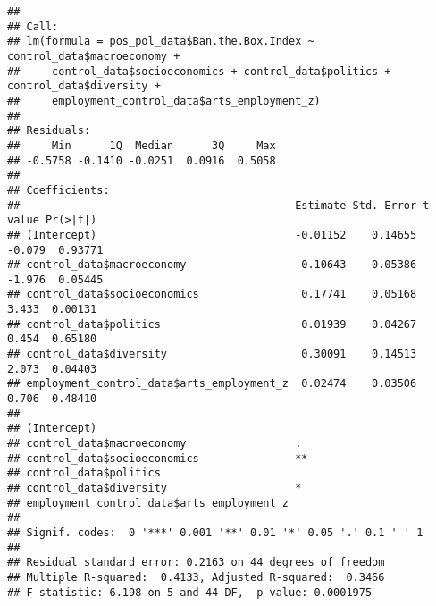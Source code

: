\documentclass[
]{article}
\newenvironment{Shaded}{\begin{snugshade}}{\end{snugshade}}
\newcommand{\CommentTok}[1]{\textcolor[rgb]{0.56,0.35,0.01}{\textit{#1}}}
\newcommand{\FunctionTok}[1]{\textcolor[rgb]{0.13,0.29,0.53}{\textbf{#1}}}
\newcommand{\NormalTok}[1]{#1}
\newcommand{\OtherTok}[1]{\textcolor[rgb]{0.56,0.35,0.01}{#1}}
\newcommand{\SpecialCharTok}[1]{\textcolor[rgb]{0.81,0.36,0.00}{\textbf{#1}}}
\begin{document}
\begin{Shaded}
\end{Shaded}

\begin{verbatim}
## 
## Call:
## lm(formula = pos_pol_data$Ban.the.Box.Index ~ control_data$macroeconomy + 
##     control_data$socioeconomics + control_data$politics + control_data$diversity + 
##     employment_control_data$arts_employment_z)
## 
## Residuals:
##     Min      1Q  Median      3Q     Max 
## -0.5758 -0.1410 -0.0251  0.0916  0.5058 
## 
## Coefficients:
##                                           Estimate Std. Error t value Pr(>|t|)
## (Intercept)                               -0.01152    0.14655  -0.079  0.93771
## control_data$macroeconomy                 -0.10643    0.05386  -1.976  0.05445
## control_data$socioeconomics                0.17741    0.05168   3.433  0.00131
## control_data$politics                      0.01939    0.04267   0.454  0.65180
## control_data$diversity                     0.30091    0.14513   2.073  0.04403
## employment_control_data$arts_employment_z  0.02474    0.03506   0.706  0.48410
##                                             
## (Intercept)                                 
## control_data$macroeconomy                 . 
## control_data$socioeconomics               **
## control_data$politics                       
## control_data$diversity                    * 
## employment_control_data$arts_employment_z   
## ---
## Signif. codes:  0 '***' 0.001 '**' 0.01 '*' 0.05 '.' 0.1 ' ' 1
## 
## Residual standard error: 0.2163 on 44 degrees of freedom
## Multiple R-squared:  0.4133, Adjusted R-squared:  0.3466 
## F-statistic: 6.198 on 5 and 44 DF,  p-value: 0.0001975
\end{verbatim}
\end{document}
